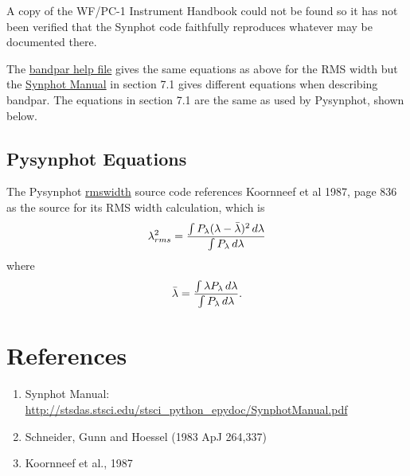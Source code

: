 \documentclass[letterpaper,10pt,english]{sphinxtsr}
\begin{document}
A copy of the WF/PC-1 Instrument Handbook could not be found so it has not been
verified that the Synphot code faithfully reproduces whatever may be documented
there.

The
\href{https://svn.stsci.edu/trac/ssb/stsci\_python/browser/stsdas/trunk/stsdas/pkg/hst\_calib/synphot/doc/bandpar.hlp}{bandpar help file}
gives the same equations as above for the RMS width but the \href{http://stsdas.stsci.edu/stsci\_python\_epydoc/SynphotManual.pdf}{Synphot Manual}
in section 7.1 gives different equations when describing bandpar. The equations
in section 7.1 are the same as used by Pysynphot, shown below.


\section{Pysynphot Equations}
\label{main:pysynphot-equations}\label{main:rmslam}
The Pysynphot \href{https://trac.assembla.com/astrolib/browser/trunk/pysynphot/lib/pysynphot/spectrum.py\#L1106}{rmswidth} source code references Koornneef et al 1987, page 836
as the source for its RMS width calculation, which is
\begin{gather}
\begin{split}\lambda_{rms}^2 = \frac{\int P_{\lambda} (\lambda - \bar{\lambda})^2 \,d\lambda}
{\int P_{\lambda} \,d\lambda}\end{split}\notag
\end{gather}
where
\begin{gather}
\begin{split}\bar{\lambda} = \frac{\int \lambda P_{\lambda} \,d\lambda}
{\int P_{\lambda} \,d\lambda}.\end{split}\notag
\end{gather}

\chapter{References}
\label{references:references}\label{references::doc}\label{references:rmswidth}\label{references:ref1}\begin{enumerate}
\item {} 
Synphot Manual: \href{http://stsdas.stsci.edu/stsci\_python\_epydoc/SynphotManual.pdf}{http://stsdas.stsci.edu/stsci\_python\_epydoc/SynphotManual.pdf}

\end{enumerate}
\label{references:ref2}\begin{enumerate}
\setcounter{enumi}{1}
\item {} 
Schneider, Gunn and Hoessel (1983 ApJ 264,337)

\end{enumerate}
\label{references:ref3}\begin{enumerate}
\setcounter{enumi}{2}
\item {} 
Koornneef et al., 1987

\end{enumerate}



\renewcommand{\indexname}{Index}
\printindex
\end{document}
